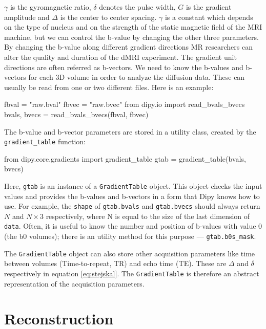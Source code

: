\documentclass{bioinfo}
\begin{document}
$\gamma$ is the gyromagnetic ratio, $\delta$ denotes the pulse width, $G$
is the gradient amplitude and $\Delta$ is the center to center spacing. $\gamma$ is
a constant which depends on the type of nucleus and on the strength of the
static magnetic field of the MRI machine, but we can control the b-value by
changing the other three parameters. By changing the b-value along different
gradient directions MR researchers can alter the quality and duration of the
dMRI experiment. The gradient unit directions are often referred as b-vectors.
We need to know the b-values and b-vectors for each 3D volume in order to
analyze the diffusion data. These can usually be read from one or two different
files. Here is an example:
\begin{python}
fbval = "raw.bval"
fbvec = "raw.bvec"
from dipy.io import read_bvals_bvecs
bvals, bvecs = read_bvals_bvecs(fbval, fbvec)
\end{python}
The b-value and b-vector parameters are stored in a utility class, created by
the \texttt{gradient\_table} function:
\begin{python}
from dipy.core.gradients import gradient_table
gtab = gradient_table(bvals, bvecs)
\end{python}
Here, \texttt{gtab} is an instance of a \texttt{GradientTable} object. This
object checks the input values and provides the b-values and b-vectors in a form
that Dipy knows how to use.  For example, the \texttt{shape} of
\texttt{gtab.bvals} and \texttt{gtab.bvecs} should always return $N$ and
$N\times3$ respectively, where N is equal to the size of the last dimension of
\texttt{data}. Often, it is useful to know the number and position of b-values
with value 0 (the b0 volumes); there is an utility method for this
purpose --- \texttt{gtab.b0s\_mask}.

The \texttt{GradientTable} object can also store other acquisition parameters
like time between volumes (Time-to-repeat, TR) and echo time (TE). These are
$\Delta$ and $\delta$ respectively in equation \ref{eq:stejskal}. The
\texttt{GradientTable} is therefore an abstract representation of the
acquisition parameters.

\section{Reconstruction}\label{reconstruction}
\end{document}
